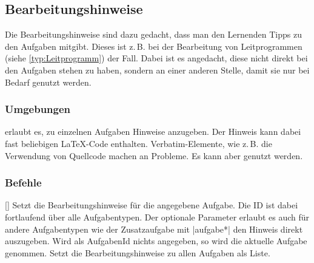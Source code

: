 \subsection{Bearbeitungshinweise}
Die Bearbeitungshinweise sind dazu gedacht, dass man den Lernenden Tipps zu den Aufgaben mitgibt. Dieses ist z.\,B. bei der Bearbeitung von Leitprogrammen (siehe \ref{typ:Leitprogramm}) der Fall. Dabei ist es angedacht, diese nicht direkt bei den Aufgaben stehen zu haben, sondern an einer anderen Stelle, damit sie nur bei Bedarf genutzt werden.

\subsubsection{Umgebungen}
\begin{environments}
     erlaubt es, zu einzelnen Aufgaben Hinweise anzugeben. Der Hinweis kann dabei fast beliebigen \LaTeX-Code enthalten. Verbatim-Elemente, wie z.\,B. die Verwendung von Quellcode machen an Probleme. Es kann aber  genutzt werden.
\end{environments}

\subsubsection{Befehle}
\begin{commands}
    [] Setzt die Bearbeitungshinweise für die angegebene Aufgabe. Die ID ist dabei fortlaufend über alle Aufgabentypen. Der optionale Parameter erlaubt es auch für andere Aufgabentypen wie der Zusatzaufgabe mit \verbcode|aufgabe*| den Hinweis direkt auszugeben. Wird als AufgabenId nichts angegeben, so wird die aktuelle Aufgabe genommen.
     Setzt die Bearbeitungshinweise zu allen Aufgaben als Liste.
\end{commands}